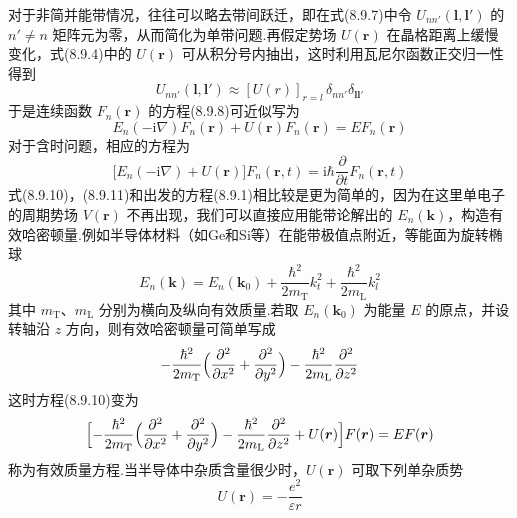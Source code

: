 对于非简并能带情况，往往可以略去带间跃迁，即在式(8.9.7)中令 $U_{nn'}(\boldsymbol{l},\boldsymbol{l}')$ 的 $n'\neq n$ 矩阵元为零，从而简化为单带问题.再假定势场 $U(\boldsymbol{r})$ 在晶格距离上缓慢变化，式(8.9.4)中的 $U(\boldsymbol{r})$ 可从积分号内抽出，这时利用瓦尼尔函数正交归一性得到
\begin{equation}
  U_{nn'}(\boldsymbol{l},\boldsymbol{l}')\approx[U(r)]_{r=l}\,\delta_{nn'}\delta_{\boldsymbol{l}\boldsymbol{l}'}
\end{equation}
于是连续函数 $F_{n}(\boldsymbol{r})$ 的方程(8.9.8)可近似写为
\begin{equation}
  E_{n}(-\mathrm{i}\nabla)F_{n}(\boldsymbol{r})+U(\boldsymbol{r})F_{n}(\boldsymbol{r})=EF_{n}(\boldsymbol{r})
\end{equation}
对于含时问题，相应的方程为
\begin{equation}
  \bigl[E_{n}(-\mathrm{i}\nabla)+U(\boldsymbol{r})\bigr]F_{n}(\boldsymbol{r},t)
  =\mathrm{i}\hbar\frac{\partial}{\partial t}F_{n}(\boldsymbol{r},t)
\end{equation}
式(8.9.10)，(8.9.11)和出发的方程(8.9.1)相比较是更为简单的，因为在这里单电子的周期势场 $V(\boldsymbol{r})$ 不再出现，我们可以直接应用能带论解出的 $E_{n}(\boldsymbol{k})$，构造有效哈密顿量.例如半导体材料（如Ge和Si等）在能带极值点附近，等能面为旋转椭球
\begin{equation}
  E_{n}(\boldsymbol{k})=E_{n}(\boldsymbol{k}_{0})
  +\frac{\hbar^{2}}{2m_{\mathrm{T}}}k_{t}^{2}
  +\frac{\hbar^{2}}{2m_{\mathrm{L}}}k_{l}^{2}
\end{equation}
其中 $m_{\mathrm{T}}$、$m_{\mathrm{L}}$ 分别为横向及纵向有效质量.若取 $E_{n}(\boldsymbol{k}_{0})$ 为能量 $E$ 的原点，并设转轴沿 $z$ 方向，则有效哈密顿量可简单写成
\begin{equation*}
  -\frac{\hbar^{2}}{2m_{\mathrm{T}}}\Bigl(\frac{\partial^{2}}{\partial x^{2}}+\frac{\partial^{2}}{\partial y^{2}}\Bigr)
  -\frac{\hbar^{2}}{2m_{\mathrm{L}}}\frac{\partial^{2}}{\partial z^{2}}
\end{equation*}
这时方程(8.9.10)变为
\begin{equation}
  \Bigl[-\frac{\hbar^{2}}{2m_{\mathrm{T}}}\Bigl(\frac{\partial^{2}}{\partial x^{2}}+\frac{\partial^{2}}{\partial y^{2}}\Bigr)
  -\frac{\hbar^{2}}{2m_{\mathrm{L}}}\frac{\partial^{2}}{\partial z^{2}}+U(\boldsymbol{r})\Bigr]F(\boldsymbol{r})=EF(\boldsymbol{r})
\end{equation}
称为有效质量方程.当半导体中杂质含量很少时，$U(\boldsymbol{r})$ 可取下列单杂质势
\begin{equation}
  U(\boldsymbol{r})=-\frac{e^{2}}{\varepsilon r}
\end{equation}
